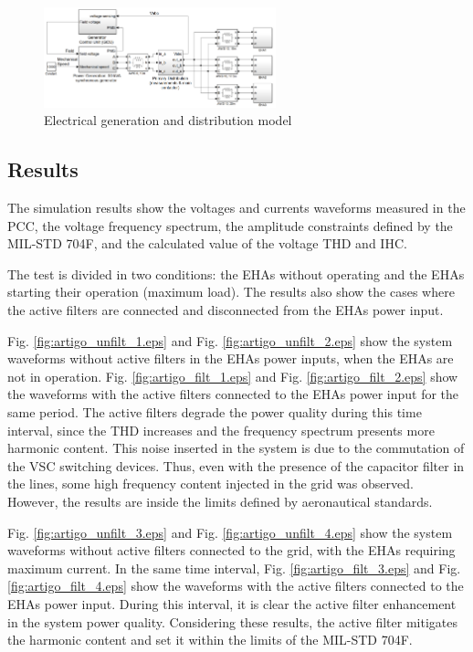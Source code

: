 \begin{figure}[!tb] %
	\centering
	\includegraphics[width=0.6\textwidth]{Figures/simulacao_simulink.png}
	\caption{Electrical generation and distribution model}
	\label{fig:simulacao_simulink.png}
\end{figure}

\subsection{Results}

The simulation results show the voltages and currents waveforms measured in the PCC, the voltage frequency spectrum, the amplitude constraints defined by the MIL-STD 704F, and the calculated value of the voltage THD and IHC.

The test is divided in two conditions:  the EHAs without operating and the EHAs starting their operation (maximum load). The results also show the cases where the active filters are connected and disconnected from the EHAs power input.

Fig. \ref{fig:artigo_unfilt_1.eps} and Fig. \ref{fig:artigo_unfilt_2.eps} show the system waveforms without active filters in the EHAs power inputs, when the EHAs are not in operation. Fig. \ref{fig:artigo_filt_1.eps} and Fig. \ref{fig:artigo_filt_2.eps} show the waveforms with the active filters connected to the EHAs power input for the same period. The active filters degrade the power quality during this time interval, since the THD increases and the frequency spectrum presents more harmonic content. This noise inserted in the system is due to the commutation of the VSC switching devices. Thus, even with the presence of the capacitor filter in the lines, some high frequency content injected in the grid was observed. However, the results are inside the limits defined by aeronautical standards.

Fig. \ref{fig:artigo_unfilt_3.eps} and Fig. \ref{fig:artigo_unfilt_4.eps} show the system waveforms without active filters connected to the grid, with the EHAs requiring maximum current. In the same time interval, Fig. \ref{fig:artigo_filt_3.eps} and Fig. \ref{fig:artigo_filt_4.eps} show the waveforms with the active filters connected to the EHAs power input. During this interval, it is clear the active filter enhancement in the system power quality. Considering these results, the active filter mitigates the harmonic content and set it within the limits of the MIL-STD 704F.

